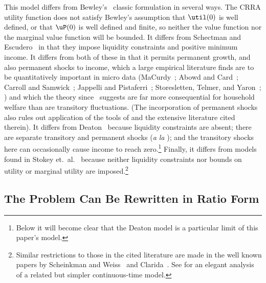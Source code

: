 \documentclass[titlepage]{\econtex}\providecommand{\texname}{BufferStockTheory}%
\begin{document}
This model differs from Bewley's~\citeyearpar{bewleyPIH} classic
formulation in several ways. The CRRA utility function does not
satisfy Bewley's assumption that $\util(0)$ is well defined, or that
$\uP(0)$ is well defined and finite, so neither the value function nor
the marginal value function will be bounded.  It differs from
Schectman and Escudero~\citeyearpar{schectman&escudero:results} in
that they impose liquidity constraints and positive minimum income.
It differs from both of these in that it permits
permanent growth, and also permanent shocks to income, which a
large empirical literature finds are to be quantitatively important in
micro data (MaCurdy~\citeyearpar{macurdy:timeseries}; Abowd and
Card~\citeyearpar{acCovariance}; Carroll and
Samwick~\citeyearpar{carroll&samwick:nature}; Jappelli and
Pistaferri~\citeyearpar{jappelli&pistaferri:cins}; Storesletten,
Telmer, and Yaron~\citeyearpar{sty:consumption}; \cite{blpRisk}) and
which the theory since~\cite{friedmanATheory} suggests are far more
consequential for household welfare than are transitory fluctuations.  (The
incorporation of permanent shocks also rules out application of the tools of \cite{mnUnique} 
and the extensive literature cited therein).  
It differs from Deaton~\citeyearpar{deatonLiqConstr} because
liquidity constraints are absent; there are separate transitory and
permanent shocks ({\it a la} \cite{muthOptimal}); and the transitory
shocks here can occasionally cause income to reach
zero.\footnote{Below it will become clear that the Deaton model is a
  particular limit of this paper's model.}  Finally, it differs from
models found in Stokey et.\ al.~\citeyearpar{slpMethods} because
neither liquidity constraints nor bounds on utility or marginal
utility are imposed.\footnote{Similar restrictions to those in the
  cited literature are made in the well known papers by Scheinkman and
  Weiss~\citeyearpar{scheinkman&weiss:borrowing} and
  Clarida~\citeyearpar{clarida:ergodic}.  See \cite{toche:urisk} for
  an elegant analysis of a related but simpler continuous-time model.}

\subsection{The Problem Can Be Rewritten in Ratio Form}

\label{subsec:ratio}
\end{document}
